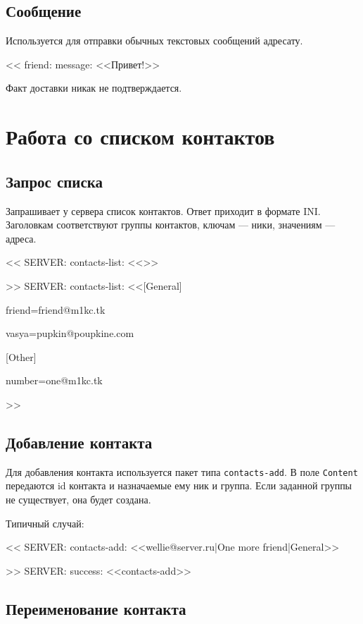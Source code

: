 \documentclass[a4paper,12pt]{book}
\begin{document}
\subsection {Сообщение}
\label{message}

Используется для отправки обычных текстовых сообщений адресату.

{\ttfamily
<{}< friend: message: <<Привет!>>
}

Факт доставки никак не подтверждается.

\section{Работа со списком контактов}

\subsection{Запрос списка}

Запрашивает у сервера список контактов. Ответ приходит в формате INI. Заголовкам соответствуют группы контактов, ключам --- ники, значениям --- адреса.

{\ttfamily
<{}< SERVER: contacts-list: <<>>

>{}> SERVER: contacts-list: <<[General]

friend=friend@m1kc.tk

vasya=pupkin@poupkine.com

[Other]

number=one@m1kc.tk

>>
}

\subsection{Добавление контакта}

Для добавления контакта используется пакет типа \texttt{contacts-add}. В поле \texttt{Content} передаются id контакта и назначаемые ему ник и группа. Если заданной группы не существует, она будет создана.

Типичный случай:

{\ttfamily
<{}< SERVER: contacts-add: <<wellie@server.ru|One more friend|General>>

>{}> SERVER: success: <<contacts-add>>
}

\subsection{Переименование контакта}
\end{document}
